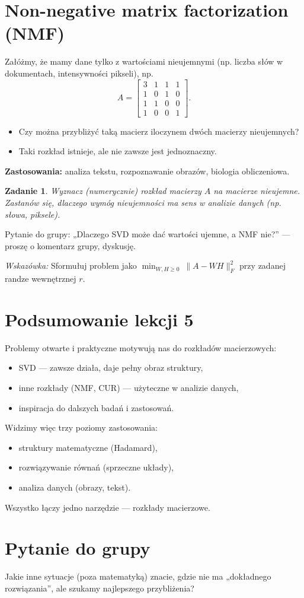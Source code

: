 \documentclass[12pt]{article}
\newtheorem{zadanie}{Zadanie}[section]
\begin{document}
\section{ Non-negative matrix factorization (NMF)}
Załóżmy, że mamy dane tylko z wartościami nieujemnymi (np. liczba słów w dokumentach, intensywności pikseli), np.
\[
A = \begin{bmatrix}
  3 &  1 &  1 &  1 \\
  1 & 0 &  1 & 0 \\
  1 &  1 & 0 & 0 \\
  1 & 0 & 0 &  1
\end{bmatrix}.
\]
\begin{itemize}
  \item Czy można przybliżyć taką macierz iloczynem dwóch macierzy nieujemnych?
  \item Taki rozkład istnieje, ale nie zawsze jest jednoznaczny.
\end{itemize}

\textbf{Zastosowania:} analiza tekstu, rozpoznawanie obrazów, biologia obliczeniowa.  

\begin{zadanie}
Wyznacz (numerycznie) rozkład macierzy \(A\) na macierze nieujemne.  
Zastanów się, dlaczego wymóg nieujemności ma sens w analizie danych (np. słowa, piksele). 
\end{zadanie}
Pytanie do grupy: „Dlaczego SVD może dać wartości ujemne, a NMF nie?” —  proszę o komentarz grupy, dyskusję.

\textit{Wskazówka:} Sformułuj problem jako 
$\min_{W,H\ge 0}\ \|A-WH\|_F^2$ przy zadanej randze wewnętrznej $r$.
\medskip

\section*{Podsumowanie lekcji 5}
Problemy otwarte i praktyczne motywują nas do rozkładów macierzowych:
\begin{itemize}
  \item SVD — zawsze działa, daje pełny obraz struktury,
  \item inne rozkłady (NMF, CUR) — użyteczne w analizie danych,
  \item inspiracja do dalszych badań i zastosowań.
\end{itemize}
Widzimy więc trzy poziomy zastosowania:
\begin{itemize}
\item  struktury matematyczne (Hadamard),
\item  rozwiązywanie równań (sprzeczne układy),
\item analiza danych (obrazy, tekst).
\end{itemize}
Wszystko łączy jedno narzędzie — rozkłady macierzowe.

\section*{Pytanie do grupy}
Jakie inne sytuacje (poza matematyką) znacie, gdzie nie ma „dokładnego rozwiązania”, 
ale szukamy najlepszego przybliżenia?
\end{document}
